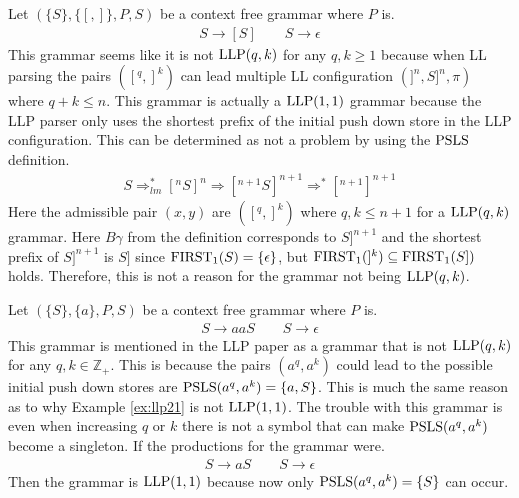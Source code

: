 \begin{example}
    Let $(\{S\}, \{[, ]\}, P, S)$ be a context free grammar where $P$ is.
    \begin{gather*}
        S \to [S] \qquad S \to \epsilon
    \end{gather*}
    This grammar seems like it is not $\text{LLP}(q, k)$ for any $q, k \geq 1$ because when LL parsing the pairs $([^q, ]^k)$ can lead multiple LL configuration $(]^n, S]^n, \pi)$ where $q + k \leq n$. This grammar is actually a $\text{LLP}(1,1)$ grammar because the LLP parser only uses the shortest prefix of the initial push down store in the LLP configuration. This can be determined as not a problem by using the $\text{PSLS}$ definition.
    \begin{align*}
        S \Rightarrow_{lm}^* [^nS]^n \Rightarrow [^{n + 1}S]^{n + 1} \Rightarrow^* [^{n + 1}]^{n + 1}
    \end{align*}
    Here the admissible pair $(x, y)$ are $([^q, ]^k)$ where $q, k \leq n + 1$ for a $\text{LLP}(q, k)$ grammar. Here $B\gamma$ from the definition corresponds to $S]^{n+1}$ and the shortest prefix of $S]^{n+1}$ is $S]$ since $\text{FIRST}_1(S) = \{\epsilon\}$, but $\text{FIRST}_1(]^k) \subseteq \text{FIRST}_1(S])$ holds. Therefore, this is not a reason for the grammar not being $\text{LLP}(q,k)$.
\end{example}

\begin{example}
    Let $(\{S\}, \{a\}, P, S)$ be a context free grammar where $P$ is.
    \begin{gather*}
        S \to aaS \qquad S \to \epsilon
    \end{gather*}
    This grammar is mentioned in the LLP paper \cite[16]{Vagner2007} as a grammar that is not $\text{LLP}(q,k)$ for any $q, k \in \mathbb{Z}_+$. This is because the pairs $(a^q, a^k)$ could lead to the possible initial push down stores are $\text{PSLS}(a^q, a^k) = \{a, S\}$. This is much the same reason as to why Example \ref{ex:llp21} is not $\text{LLP}(1, 1)$. The trouble with this grammar is even when increasing $q$ or $k$ there is not a symbol that can make $\text{PSLS}(a^q, a^k)$ become a singleton. If the productions for the grammar were.
    \begin{gather*}
        S \to aS \qquad S \to \epsilon
    \end{gather*}
    Then the grammar is $\text{LLP}(1, 1)$ because now only $\text{PSLS}(a^q, a^k) = \{S\}$ can occur.
\end{example}